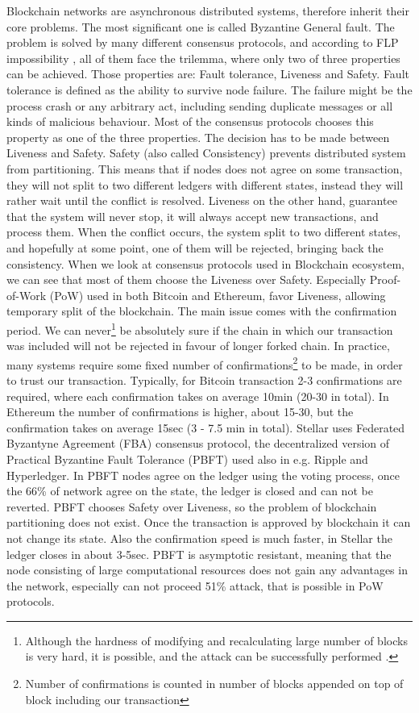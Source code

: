 \documentclass[nostrict]{szablonPG}
\begin{document}
Blockchain networks are asynchronous distributed systems, therefore inherit their core problems. The most significant one is called Byzantine General fault. The problem is solved by many different consensus protocols, and according to FLP impossibility \cite{fischer1985impossibility}, all of them face the trilemma, where only two of three properties can be achieved. Those properties are: Fault tolerance, Liveness and Safety. Fault tolerance is defined as the ability to survive node failure. The failure might be the process crash or any arbitrary act, including sending duplicate messages or all kinds of malicious behaviour. Most of the consensus protocols chooses this property as one of the three properties. The decision has to be made between Liveness and Safety. Safety (also called Consistency) prevents distributed system from partitioning. This means that if nodes does not agree on some transaction, they will not split to two different ledgers with different states, instead they will rather wait until the conflict is resolved. Liveness on the other hand, guarantee that the system will never stop, it will always accept new transactions, and process them. When the conflict occurs, the system split to two different states, and hopefully at some point, one of them will be rejected, bringing back the consistency.
When we look at consensus protocols used in Blockchain ecosystem, we can see that most of them choose the Liveness over Safety. Especially Proof-of-Work (PoW) used in both Bitcoin and Ethereum, favor Liveness, allowing temporary split of the blockchain. The main issue comes with the confirmation period. We can never\footnote{Although the hardness of modifying and recalculating large number of blocks is very hard, it is possible, and the attack can be successfully performed \cite{sayeed2019assessing}.} be absolutely sure if the chain in which our transaction was included will not be rejected in favour of longer forked chain. In practice, many systems require some fixed number of confirmations\footnote{Number of confirmations is counted in number of blocks appended on top of block including our transaction} to be made, in order to trust our transaction. Typically, for Bitcoin transaction 2-3 confirmations are required, where each confirmation takes on average 10min (20-30 in total). In Ethereum the number of confirmations is higher, about 15-30, but the confirmation takes on average 15sec (3 - 7.5 min in total). Stellar uses Federated Byzantyne Agreement (FBA) consensus protocol, the decentralized version of Practical Byzantine Fault Tolerance (PBFT) \cite{castro1999practical} used also in e.g. Ripple and Hyperledger. In PBFT nodes agree on the ledger using the voting process, once the 66\% of network agree on the state, the ledger is closed and can not be reverted. PBFT chooses Safety over Liveness, so the problem of blockchain partitioning does not exist. Once the transaction is approved by blockchain it can not change its state. Also the confirmation speed is much faster, in Stellar the ledger closes in about 3-5sec. PBFT is asymptotic resistant, meaning that the node consisting of large computational resources does not gain any advantages in the network, especially can not proceed 51\% attack, that is possible in PoW protocols. 
\end{document}
